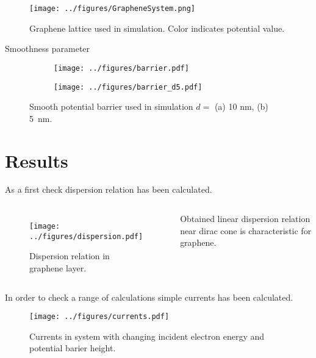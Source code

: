 \documentclass{beamer}
\begin{document}
\begin{frame}
	\begin{figure}
		\begin{center}
			\texttt{[image: ../figures/GrapheneSystem.png]}
		\end{center}
		\caption{Graphene lattice used in simulation. Color indicates potential value.}
	\end{figure}
\end{frame}

\begin{frame}{Smoothness parameter}
	\begin{figure}
		\centering
		\begin{subfigure}{0.49\textwidth}
			\texttt{[image: ../figures/barrier.pdf]}
			\caption{}
		\end{subfigure}
		\begin{subfigure}{0.49\textwidth}
			\texttt{[image: ../figures/barrier\_d5.pdf]}
			\caption{}
		\end{subfigure}
		\caption{Smooth potential barrier used in simulation $d = $ (a) 10 nm, (b) 5~nm.}
	\end{figure}
\end{frame}

\section{Results}

\begin{frame}
	As a first check dispersion relation has been calculated.
	\begin{columns}
		\begin{figure}
			\begin{center}
				\texttt{[image: ../figures/dispersion.pdf]}
			\end{center}
			\caption{Dispersion relation in graphene layer.}
		\end{figure}
        \hspace{0.03\textwidth}
        Obtained linear dispersion relation near dirac cone is characteristic for graphene. 
	\end{columns}
\end{frame}

\begin{frame}
    In order to check a range of calculations simple currents has been calculated.
    \begin{figure}
        \begin{center}
            \texttt{[image: ../figures/currents.pdf]}
        \end{center}
        \caption{Currents in system with changing incident electron energy and potential barier height.}
    \end{figure}
\end{frame}
\end{document}
